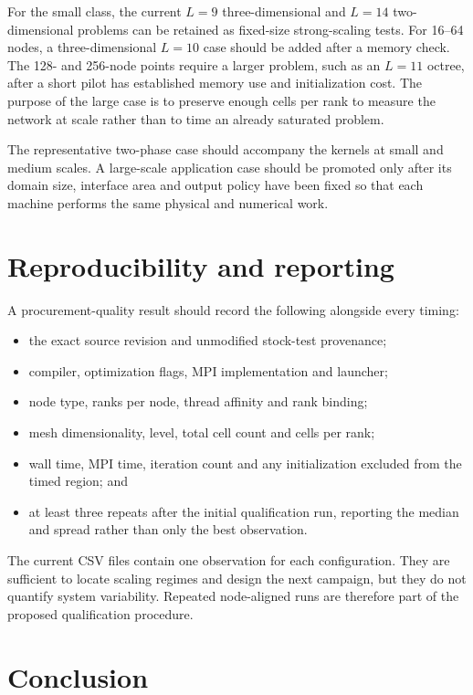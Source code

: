 \documentclass[11pt,a4paper]{article}
\begin{document}
For the small class, the current $L=9$ three-dimensional and $L=14$
two-dimensional problems can be retained as fixed-size strong-scaling tests.
For 16--64 nodes, a three-dimensional $L=10$ case should be added after a
memory check. The 128- and 256-node points require a larger problem, such as an
$L=11$ octree, after a short pilot has established memory use and initialization
cost. The purpose of the large case is to preserve enough cells per rank to
measure the network at scale rather than to time an already saturated problem.

The representative two-phase case should accompany the kernels at small and
medium scales. A large-scale application case should be promoted only after
its domain size, interface area and output policy have been fixed so that each
machine performs the same physical and numerical work.

\section{Reproducibility and reporting}

A procurement-quality result should record the following alongside every
timing:
\begin{itemize}
  \item the exact source revision and unmodified stock-test provenance;
  \item compiler, optimization flags, MPI implementation and launcher;
  \item node type, ranks per node, thread affinity and rank binding;
  \item mesh dimensionality, level, total cell count and cells per rank;
  \item wall time, MPI time, iteration count and any initialization excluded
        from the timed region; and
  \item at least three repeats after the initial qualification run, reporting
        the median and spread rather than only the best observation.
\end{itemize}

The current CSV files contain one observation for each configuration. They are
sufficient to locate scaling regimes and design the next campaign, but they do
not quantify system variability. Repeated node-aligned runs are therefore part
of the proposed qualification procedure.

\section{Conclusion}
\end{document}
